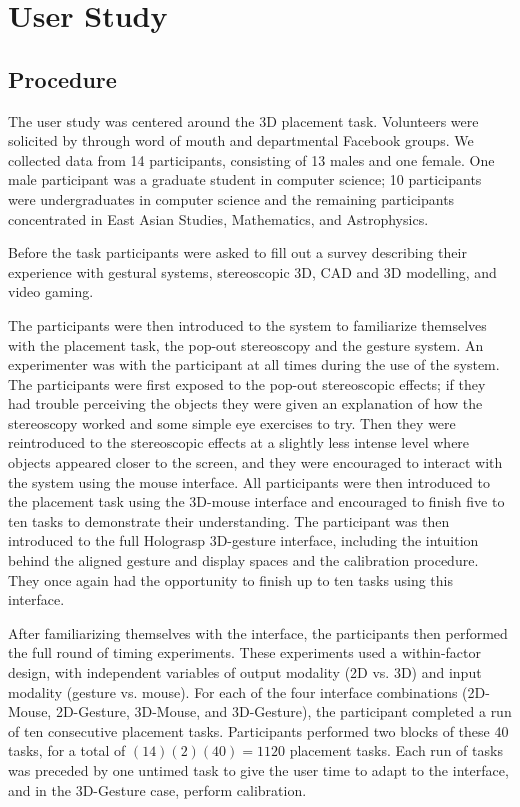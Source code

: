 \documentclass[pageno]{jpaper}
\begin{document}
\section{User Study}
\subsection{Procedure}
The user study was centered around the 3D placement task. Volunteers were solicited by 
through word of mouth and departmental Facebook groups. We collected data from 14 participants,
consisting of 13 males and one female. One male participant was a graduate student in computer
science; 10 participants were undergraduates in computer science and the remaining participants
concentrated in East Asian Studies, Mathematics, and Astrophysics.

Before the task participants were asked to fill out a survey describing their experience with
gestural systems, stereoscopic 3D, CAD and 3D modelling, and video gaming. 

The participants were then introduced to the system to familiarize themselves with the placement task, the pop-out
stereoscopy and the gesture system. An experimenter was with the participant at all times during
the use of the system. The participants were first exposed to the pop-out stereoscopic effects;
if they had trouble perceiving the objects they were given an explanation of how the stereoscopy
worked and some simple eye exercises to try. Then they were reintroduced to the stereoscopic effects
at a slightly less intense level where objects appeared closer to the screen, and they were encouraged
to interact with the system using the mouse interface. All participants were then introduced to the placement
task using the 3D-mouse interface and encouraged to finish five to ten tasks to demonstrate their understanding.
The participant was then introduced to the full Holograsp 3D-gesture interface, including the intuition behind the aligned gesture and display
spaces and the calibration procedure. They once again had the opportunity to finish up to ten tasks using this interface.

After familiarizing themselves with the interface, the participants then performed the full round of timing experiments. These
experiments used a within-factor design, with independent variables of output modality (2D vs. 3D) and input modality (gesture vs. mouse).
For each of the four interface combinations (2D-Mouse, 2D-Gesture, 3D-Mouse, and 3D-Gesture), the participant completed a 
run of ten consecutive placement tasks. Participants performed two blocks of these 40 tasks, for a total of $(14)(2)(40) = 1120$
placement tasks. Each run of tasks was preceded by one untimed task to give the user time to adapt to the interface, and 
in the 3D-Gesture case, perform calibration.
\end{document}
